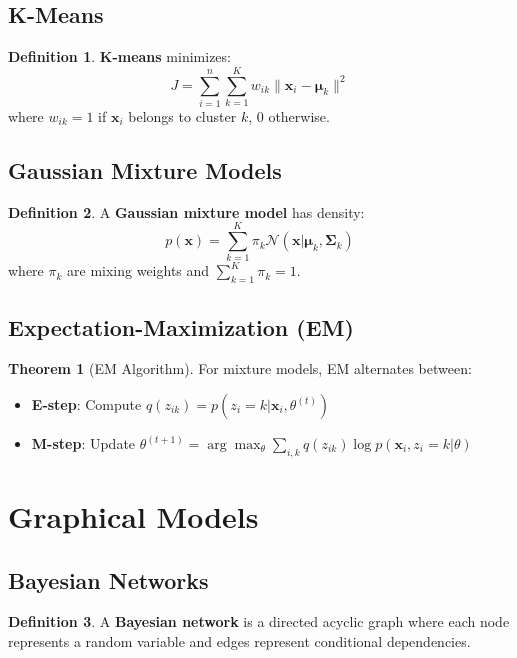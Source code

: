 \documentclass[11pt]{article}
\theoremstyle{definition}
\newtheorem{definition}{Definition}[section]
\newtheorem{theorem}{Theorem}[section]
\begin{document}
\subsection{K-Means}
\begin{definition}
\textbf{K-means} minimizes:
$$J = \sum_{i=1}^n \sum_{k=1}^K w_{ik} \|\mathbf{x}_i - \boldsymbol{\mu}_k\|^2$$
where $w_{ik} = 1$ if $\mathbf{x}_i$ belongs to cluster $k$, 0 otherwise.
\end{definition}

\subsection{Gaussian Mixture Models}
\begin{definition}
A \textbf{Gaussian mixture model} has density:
$$p(\mathbf{x}) = \sum_{k=1}^K \pi_k \mathcal{N}(\mathbf{x}|\boldsymbol{\mu}_k, \boldsymbol{\Sigma}_k)$$
where $\pi_k$ are mixing weights and $\sum_{k=1}^K \pi_k = 1$.
\end{definition}

\subsection{Expectation-Maximization (EM)}
\begin{theorem}[EM Algorithm]
For mixture models, EM alternates between:
\begin{itemize}
    \item \textbf{E-step}: Compute $q(z_{ik}) = p(z_i = k|\mathbf{x}_i, \theta^{(t)})$
    \item \textbf{M-step}: Update $\theta^{(t+1)} = \arg\max_\theta \sum_{i,k} q(z_{ik}) \log p(\mathbf{x}_i, z_i = k|\theta)$
\end{itemize}
\end{theorem}

\section{Graphical Models}

\subsection{Bayesian Networks}
\begin{definition}
A \textbf{Bayesian network} is a directed acyclic graph where each node represents a random variable and edges represent conditional dependencies.
\end{definition}
\end{document}
